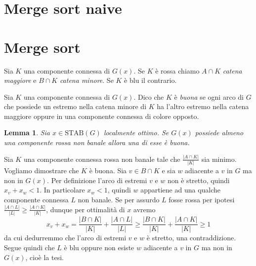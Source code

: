 \documentclass[12pt]{article}
\newtheorem{lemma}[theorem]{Lemma}
\newenvironment{proof}[1][Dimostrazione.]{ 
\begin{trivlist}
	\item[\hskip \labelsep {\bfseries #1}]}{ 
\end{trivlist}
}
\newenvironment{definition}[1][Definizione.]{ 
\begin{trivlist}
	\item[\hskip \labelsep {\bfseries #1}]}{ 
\end{trivlist}
}
\begin{document}
\section{Merge sort naive}

\section{Merge sort} 
\begin{definition}
	Sia \(K\) una componente connessa di \(G(x)\). Se \(K\) è rossa chiamo \(A\cap K\) \emph{catena maggiore} e \(B\cap K\) \emph{catena minore}. Se \(K\) è blu il contrario. 
\end{definition}
\begin{definition}
	Sia \(K\) una componente connessa di \(G(x)\). Dico che \(K\) è \emph{buona} se ogni arco di \(G\) che possiede un estremo nella catena minore di \(K\) ha l'altro estremo nella catena maggiore oppure in una componente connessa di colore opposto. 
\end{definition}
\begin{lemma}
	Sia \(x\in \text{STAB}(G)\) localmente ottimo. Se \(G(x)\) possiede almeno una componente rossa non banale allora una di esse è buona. 
\end{lemma}
\begin{proof}
	Sia \(K\) una componente connessa rossa non banale tale che \(\frac{|A\cap K|}{|K|}\) sia minimo. Vogliamo dimostrare che \(K\) è buona. Sia \(v\in B\cap K\) e sia \(w\) adiacente a \(v\) in \(G\) ma non in \(G(x)\). Per definizione l'arco di estremi \(v\) e \(w\) non è stretto, quindi \(x_v+x_w<1\). In particolare \(x_w<1\), quindi \(w\) appartiene ad una qualche componente connessa \(L\) non banale. Se per assurdo \(L\) fosse rossa per ipotesi \(\frac{|A\cap L|}{|L|}\ge\frac{|A\cap K|}{|K|}\), dunque per ottimalità di \(x\) avremo
	\[x_v+x_w=\frac{|B\cap K|}{|K|}+\frac{|A\cap L|}{|L|}\ge\frac{|B\cap K|}{|K|}+\frac{|A\cap K|}{|K|}\ge 1\]
	da cui dedurremmo che l'arco di estremi \(v\) e \(w\) è stretto, una contraddizione. Segue quindi che \(L\) è blu oppure non esiste \(w\) adiacente a \(v\) in \(G\) ma non in \(G(x)\), cioè la tesi. 
\end{proof}

 
 
\end{document}

